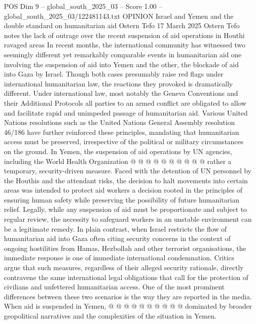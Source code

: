 \begin{textsample}{POS Dim 9 – global\_south\_2025\_03 – Score 1.00 – global\_south\_2025\_03/122481143.txt}  \label{ex:f9_pos_053}
OPINION Israel and Yemen and the double standard on humanitarian aid Ostern Tefo 17 March 2025 Ostern Tefo notes the lack of outrage over the recent suspension of aid operations in Houthi ravaged areas In recent months, the international community has witnessed two seemingly different yet remarkably comparable events in humanitarian aid one involving the suspension of aid into Yemen and the other, the blockade of aid into Gaza by Israel.
Though both cases presumably raise red flags under international humanitarian law, the reactions they provoked is dramatically different.
Under international law, most notably the Geneva Conventions and their Additional Protocols all parties to an armed conflict are obligated to allow and facilitate rapid and unimpeded passage of humanitarian aid.
Various United Nations resolutions such as the United Nations General Assembly resolution 46/186 have further reinforced these principles, mandating that humanitarian access must be preserved, irrespective of the political or military circumstances on the ground.
In Yemen, the suspension of aid operations by UN agencies, including the World Health Organization @ @ @ @ @ @ @ @ @ @ rather a temporary, security-driven measure.
Faced with the detention of UN personnel by the Houthis and the attendant risks, the decision to halt movements into certain areas was intended to protect aid workers a decision rooted in the principles of ensuring human safety while preserving the possibility of future humanitarian relief.
Legally, while any suspension of aid must be proportionate and subject to regular review, the necessity to safeguard workers in an unstable environment can be a legitimate remedy.
In plain contrast, when Israel restricts the flow of humanitarian aid into Gaza often citing security concerns in the context of ongoing hostilities from Hamas, Hezbollah and other terrorist organisations, the immediate response is one of immediate international condemnation.
Critics argue that such measures, regardless of their alleged security rationale, directly contravene the same international legal obligations that call for the protection of civilians and unfettered humanitarian access.
One of the most prominent differences between these two scenarios is the way they are reported in the media.
When aid is suspended in Yemen, @ @ @ @ @ @ @ @ @ @ dominated by broader geopolitical narratives and the complexities of the situation in Yemen.

\end{textsample}
